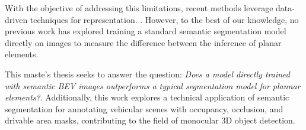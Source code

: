 With the objective of addressing this limitations, recent methods leverage data-driven techniques for  representation. \cite{view_parsing_network} \cite{lift_splat_shoot} \cite{m2bev}. However, to the best of our knowledge, no previous work has explored training a standard semantic segmentation model directly on  images to measure the difference between the inference of planar elements.

This maste's thesis seeks to answer the question: \textit{Does a model directly trained with semantic BEV images outperforms a typical segmentation model for plannar elements?}. Additionally, this work explores a technical application of  semantic segmentation for annotating vehicular scenes with occupancy, occlusion, and drivable area masks, contributing to the field of monocular 3D object detection.